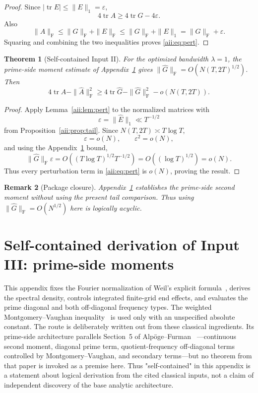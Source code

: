 \documentclass[11pt]{article}
\newtheorem{theorem}{Theorem}[section]
\newtheorem{remark}[theorem]{Remark}
\DeclareMathOperator{\tr}{tr}
\newcommand{\Frob}{\mathrm F}
\begin{document}
\begin{proof}
Since $|\tr E|\le\|E\|_1=\varepsilon$,
\[
 4\tr A\ge4\tr G-4\varepsilon.
\]
Also
\[
 \|A\|_{\Frob}
 \le
 \|G\|_{\Frob}+\|E\|_{\Frob}
 \le
 \|G\|_{\Frob}+\|E\|_1
 =
 \|G\|_{\Frob}+\varepsilon.
\]
Squaring and combining the two inequalities proves \eqref{aii:eq:pert}.
\end{proof}

\begin{theorem}[Self-contained Input II]\label{aii:thm:II}
For the optimized bandwidth $\lambda=1$, the prime-side moment estimate of Appendix~\ref{app:inputIII} gives $\|\widehat G\|_{\Frob}=O(N(T,2T)^{1/2})$.  Then
\[
 \boxed{
 4\tr\widehat A-\|\widehat A\|_{\Frob}^2
 \ge
 4\tr\widehat G-\|\widehat G\|_{\Frob}^2
 -o(N(T,2T)).
 }
\]
\end{theorem}

\begin{proof}
Apply Lemma~\ref{aii:lem:pert} to the normalized matrices with
\[
 \varepsilon=\|\widehat E\|_1\ll T^{-1/2}
\]
from Proposition~\ref{aii:prop:tail}.  Since
$N(T,2T)\asymp T\log T$,
\[
 \varepsilon=o(N),
 \qquad
 \varepsilon^2=o(N),
\]
and using the Appendix~\ref{app:inputIII} bound,
\[
 \|\widehat G\|_{\Frob}\varepsilon
 =
 O\!\left((T\log T)^{1/2}T^{-1/2}\right)
 =
 O((\log T)^{1/2})
 =
 o(N).
\]
Thus every perturbation term in \eqref{aii:eq:pert} is $o(N)$, proving the
result.
\end{proof}

\begin{remark}[Package closure]
Appendix~\ref{app:inputIII} establishes the prime-side second moment without using the present tail comparison.  Thus using $\|\widehat G\|_{\Frob}=O(N^{1/2})$ here is logically acyclic.
\end{remark}



\section{Self-contained derivation of Input III: prime-side moments}\label{app:inputIII}
This appendix fixes the Fourier normalization of Weil's explicit formula~\cite{Weil52,Titchmarsh86},
derives the spectral density, controls integrated finite-grid end effects,
and evaluates the prime diagonal and both off-diagonal frequency types.
The weighted Montgomery--Vaughan inequality~\cite{MV74} is used only with an unspecified
absolute constant.
The route is deliberately written out from these classical ingredients.  Its
prime-side architecture parallels Section~5 of Alpöge--Furman
~\cite{AlpogeFurman26}---continuous second moment, diagonal prime term,
quotient-frequency off-diagonal terms controlled by Montgomery--Vaughan,
and secondary terms---but no theorem from that paper is invoked as a
premise here.  Thus "self-contained" in this appendix is a statement
about logical derivation from the cited classical inputs, not a claim of
independent discovery of the base analytic architecture.
\end{document}
